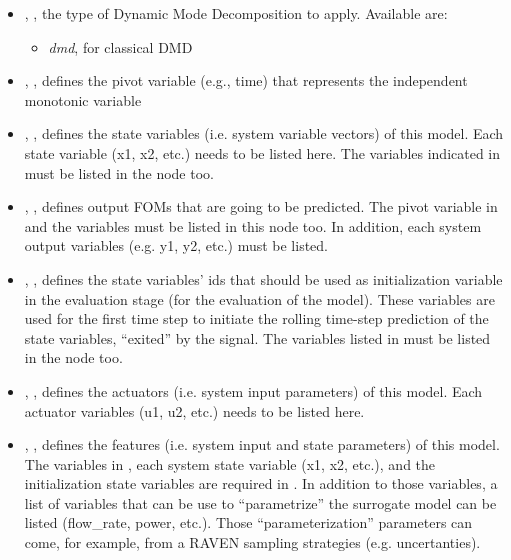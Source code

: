 \begin{itemize}
  \item {}, , the type of Dynamic 
  Mode Decomposition to apply. Available are:
    \begin{itemize}
      \item \textit{dmd}, for classical DMD
    \end{itemize}
  \item {}, , defines the pivot 
  variable (e.g., time) that represents the
  independent monotonic variable
  
  \item {}, ,  
  defines the state variables (i.e. system variable vectors)
  of this model. Each state variable (x1, x2, etc.) needs to be listed here. The variables 
  indicated in  must be listed in the 
    node too.
  
  \item {}, , defines 
  output FOMs that are going to be predicted.
  The pivot variable in  and the  
  variables must be listed in this node too. In addition, each system output variables 
  (e.g. y1, y2, etc.) must be listed.
    
  \item {},  ,  defines the state variables' ids  that should be used as initialization variable
  in the evaluation stage (for the evaluation of the model). These variables are used
  for the first time step to initiate the rolling time-step prediction of the state variables,
  ``exited'' by the  signal. The variables listed in 
   must be listed in the   node too.
  
  \item {}, , 
  defines the actuators (i.e. system input parameters)
  of this model. Each actuator variables (u1, u2, etc.) needs to be listed here.
  
  \item {}, , defines 
  the features (i.e. system input and state 
  parameters) of this model. The variables in ,  each system state 
  variable  (x1, x2, etc.), and the initialization state variables  
   are required in . In addition to those
  variables, a list of variables that can be use to ``parametrize'' the surrogate model 
  can be listed (flow\_rate, power, etc.). Those ``parameterization'' parameters can 
  come, for example, from a RAVEN sampling strategies (e.g. uncertanties).
  

\end{itemize}
